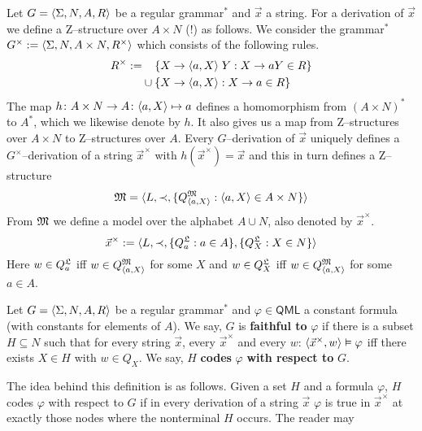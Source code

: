 Let $G = \langle \Sigma, N, A, R\rangle$ be a regular grammar$^{\ast}$
and $\vec{x}$ a string. For a derivation of $\vec{x}$
we define a Z--structure over $A \times N$ (!) as follows.
We consider the grammar$^{\ast}$ $G^{\times} := \langle \Sigma,
N, A \times N, R^{\times}\rangle$ which consists of the following
rules.
\begin{align}
R^{\times} := &  \phantom{\mbox{}\cup\mbox{}}
\{X \pf \auf a,X\zu \; Y : X \pf aY \in R\} \\\notag
              & \cup \{X \pf \auf a, X\zu : X \pf a \in R\}
\end{align}
The map $h \colon A \times N \rightarrow A \colon \langle a, X\rangle \mapsto a$
defines a homomorphism from $(A \times N)^{\ast}$ to
$A^{\ast}$, which we likewise denote by $h$. It also gives
us a map from Z--structures over $A \times N$ to Z--structures
over $A$. Every $G$--derivation of $\vec{x}$ uniquely defines
a $G^{\times}$--derivation of a string $\vec{x}^{\times}$
with $h(\vec{x}^{\times}) = \vec{x}$ and this in turn
defines a Z--structure
\begin{equation}
\mathfrak{M} = \langle L, \prec, \{Q_{\langle a, X\rangle}^{\mathfrak{M}} :
\langle a, X\rangle \in A \times N\}\rangle
\end{equation}
From $\mathfrak{M}$ we define a model over the alphabet $A \cup N$, 
also denoted by $\vec{x}^{\times}$.
\begin{equation}
\vec{x}^{\times} := \langle L, \prec, \{Q^{\mathfrak{L}}_a : a \in A\},
\{Q^{\mathfrak{L}}_X : X \in N\}\rangle
\end{equation}
Here $w \in Q^{\mathfrak{L}}_a$ iff $w \in Q_{\langle a,X\rangle}^{\mathfrak{M}}$
for some $X$ and $w \in Q^{\mathfrak{L}}_X$ iff $w \in
Q_{\langle a,X\rangle}^{\mathfrak{M}}$ for some $a \in A$. 
\begin{defn}
Let $G = \langle \Sigma, N,A,R\rangle$ be a regular grammar$^{\ast}$
and $\varphi \in \mathsf{QML}$ a constant formula (with constants 
for elements of $A$). We say, $G$ is \textbf{faithful to} $\varphi$
if there is a subset $H \subseteq N$ such that for
every string $\vec{x}$, every $\vec{x}^{\times}$ and every
$w$: $\langle \vec{x}^{\times}, w\rangle \vDash \varphi$ iff
there exists $X \in H$ with $w \in Q_X$. We say, $H$ 
\textbf{codes} $\varphi$ \textbf{with respect to} $G$.
\end{defn}
The idea behind this definition is as follows. Given a set
$H$ and a formula $\varphi$, $H$ codes $\varphi$
with respect to $G$ if in every derivation of a string
$\vec{x}$ $\varphi$ is true in $\vec{x}^{\times}$ at exactly 
those nodes where the nonterminal $H$ occurs. The reader may 
